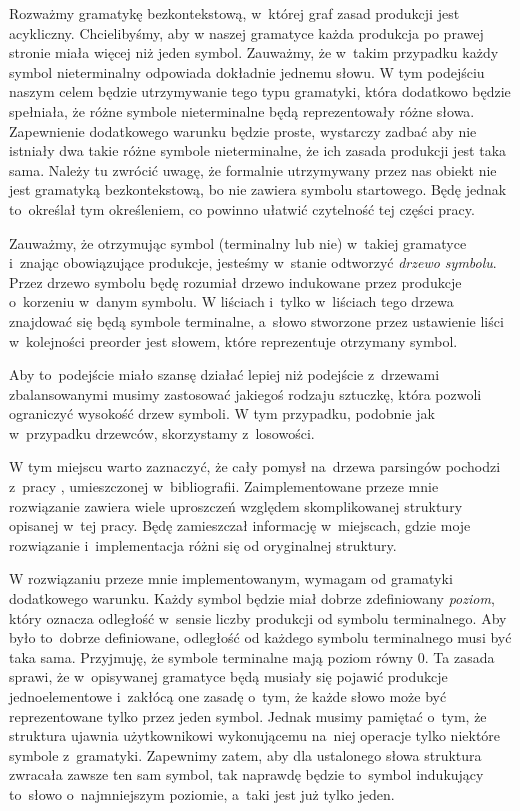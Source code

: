 \documentclass[declaration,shortabstract]{iithesis}
\theoremstyle{definition} \newtheorem{definition}{Definicja}[chapter]
\theoremstyle{plain} \newtheorem{remark}[definition]{Obserwacja}
\theoremstyle{plain} \newtheorem{theorem}[definition]{Twierdzenie}
\theoremstyle{plain} \newtheorem{example}{Przykład}[definition]
\theoremstyle{plain} \newtheorem{lemma}[definition]{Lemat}
\begin{document}
Rozważmy gramatykę bezkontekstową, w~której graf zasad produkcji jest acykliczny. Chcielibyśmy, aby w naszej gramatyce każda produkcja po prawej stronie miała więcej niż jeden symbol. Zauważmy, że w~takim przypadku każdy symbol nieterminalny odpowiada dokładnie jednemu słowu. W tym podejściu naszym celem będzie utrzymywanie tego typu gramatyki, która dodatkowo będzie spełniała, że różne symbole nieterminalne będą reprezentowały różne słowa. Zapewnienie dodatkowego warunku będzie proste, wystarczy zadbać aby nie istniały dwa takie różne symbole nieterminalne, że ich zasada produkcji jest taka sama. Należy tu zwrócić uwagę, że formalnie utrzymywany przez nas obiekt nie jest gramatyką bezkontekstową, bo nie zawiera symbolu startowego. Będę jednak to~określał tym określeniem, co powinno ułatwić czytelność tej części pracy.

Zauważmy, że otrzymując symbol (terminalny lub nie) w~takiej gramatyce i~znając obowiązujące produkcje, jesteśmy w~stanie odtworzyć \textit{drzewo symbolu}. Przez drzewo symbolu będę rozumiał drzewo indukowane przez produkcje o~korzeniu w~danym symbolu. W liściach i~tylko w~liściach tego drzewa znajdować się będą symbole terminalne, a~słowo stworzone przez ustawienie liści w~kolejności preorder jest słowem, które reprezentuje otrzymany symbol.

Aby to~podejście miało szansę działać lepiej niż podejście z~drzewami zbalansowanymi musimy zastosować jakiegoś rodzaju sztuczkę, która pozwoli ograniczyć wysokość drzew symboli. W tym przypadku, podobnie jak w~przypadku drzewców, skorzystamy z~losowości.

W tym miejscu warto zaznaczyć, że cały pomysł na~drzewa parsingów pochodzi z~pracy \cite{gawrychowski}, umieszczonej w~bibliografii. Zaimplementowane przeze mnie rozwiązanie zawiera wiele uproszczeń względem skomplikowanej struktury opisanej w~tej pracy. Będę zamieszczał informację w~miejscach, gdzie moje rozwiązanie i~implementacja różni się od oryginalnej struktury.

W rozwiązaniu przeze mnie implementowanym, wymagam od gramatyki dodatkowego warunku. Każdy symbol będzie miał dobrze zdefiniowany \textit{poziom}, który oznacza odległość w~sensie liczby produkcji od symbolu terminalnego. Aby było to~dobrze definiowane, odległość od każdego symbolu terminalnego musi być taka sama. Przyjmuję, że symbole terminalne mają poziom równy $0$. Ta zasada sprawi, że w~opisywanej gramatyce będą musiały się pojawić produkcje jednoelementowe i~zakłócą one zasadę o~tym, że każde słowo może być reprezentowane tylko przez jeden symbol. Jednak musimy pamiętać o~tym, że struktura ujawnia użytkownikowi wykonującemu na~niej operacje tylko niektóre symbole z~gramatyki. Zapewnimy zatem, aby dla ustalonego słowa struktura zwracała zawsze ten sam symbol, tak naprawdę będzie to~symbol indukujący to~słowo o~najmniejszym poziomie, a~taki jest już tylko jeden.
\end{document}
